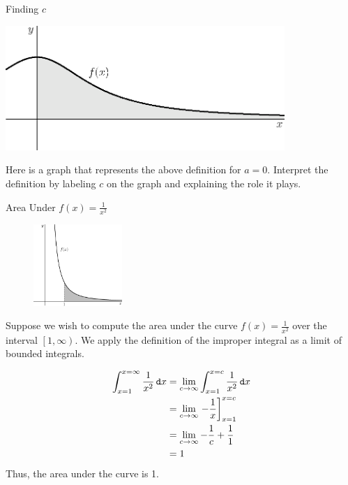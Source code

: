 \begin{exercise}{Finding $c$ \Coffeecup}
	\begin{center}
        \includegraphics[width=300pt]{ChapterGeom/Figures/unboundhorizont.eps}
	\end{center}
Here is a graph that represents the above definition for $a=0$.  Interpret the definition by labeling $c$ on the graph and explaining the role it plays.  \vspace*{1in}
\end{exercise}

\begin{example}{Area Under $f(x)=\frac{1}{x^2}$}

	\begin{figure}
    	\centering
		\includegraphics[width=0.3\textwidth]{ChapterGeom/Figures/AreaUnder1Overx2}
	\end{figure}

Suppose we wish to compute the area under the curve $f(x)=\frac{1}{x^2}$ over the interval $\left[1,\infty\right)$.  We apply the definition of the improper integral as a limit of bounded integrals.  

\begin{align*}
\int_{x=1}^{x=\infty}\frac{1}{x^2}\mathop{}\!\mathtt{d} x &= \lim_{c \rightarrow \infty} \int_{x=1}^{x=c} \frac{1}{x^2} \mathop{}\!\mathtt{d} x \\
&= \lim_{c \rightarrow \infty} \left.-\frac{1}{x} \right]_{x=1}^{x=c}\\
&= \lim_{c \rightarrow \infty} -\frac{1}{c}+\frac{1}{1} \\
&=1
\end{align*}
Thus, the area under the curve is 1.
\end{example}

